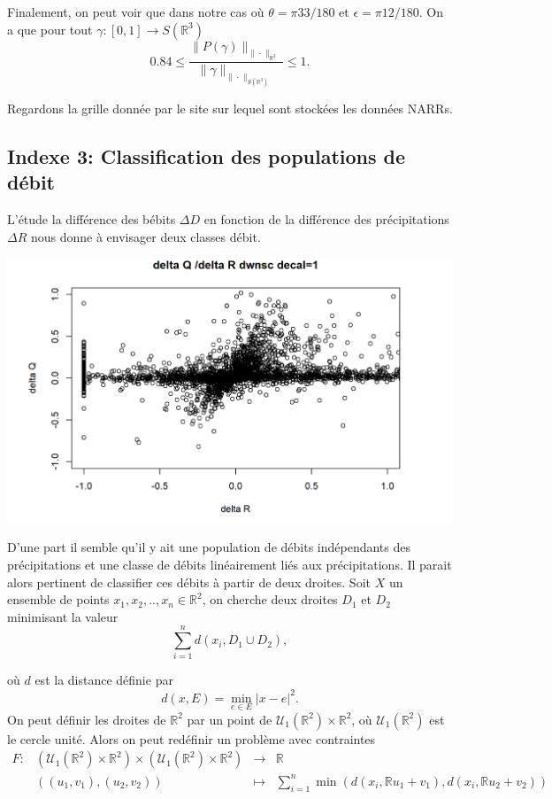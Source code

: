 \documentclass[a4paper,10pt]{article}
\begin{document}
Finalement, on peut voir que dans notre cas où $\theta=\pi 33/180$ et $\epsilon=\pi 12/180$. On a que pour tout $\gamma:[0,1]\to S(\mathbb{R}^3)$
\[0.84\leq \frac{\|P(\gamma)\|_{\|\cdot\|_{\mathbb{R}^2}}}{\|\gamma\|_{\|\cdot\|_{S(\mathbb{R}^3)}}} \leq 1.\]


Regardons la grille donnée par le site sur lequel sont stockées les données NARRs.

\subsection{Indexe 3: Classification des populations de débit}

L'étude la différence des bébits $\Delta D$ en fonction de la différence des précipitations $\Delta R$ nous donne à envisager deux classes débit.

\begin{center}
	\includegraphics[scale=0.3]{images/deb_prec_dec1.png}
\end{center}

D'une part il semble qu'il y ait une population de débits indépendants des précipitations et une classe de débits linéairement liés aux précipitations. Il parait alors pertinent de classifier ces débits à partir de deux droites.
Soit $X$ un ensemble de points  $x_1, x_2, .., x_n \in \mathbb{R}^2$, on cherche deux droites $D_1$ et $D_2$ minimisant la valeur
\[\sum_{i=1}^{n}d(x_i, D_1 \cup D_2),\]

où $d$ est la distance définie par 
\[d(x,E)= \min_{e \in E} |x-e|^2.\]
On peut définir les droites de $\mathbb{R}^2$ par un point de $\mathcal{U}_1(\mathbb{R}^2)\times\mathbb{R}^2$, où $\mathcal{U}_1(\mathbb{R}^2)$ est le cercle unité. Alors on peut redéfinir un problème avec contraintes 
\begin{equation}
	\label{F}
	\begin{array}{cccc}
		F: & (\mathcal{U}_1(\mathbb{R}^2)\times\mathbb{R}^2) \times (\mathcal{U}_1(\mathbb{R}^2)\times\mathbb{R}^2) &\to &\mathbb{R}\\
		& ((u_1,v_1), (u_2,v_2)) & \mapsto & \sum_{i=1}^{n}\min (d(x_i,\mathbb{R}u_1+v_1), d(x_i,\mathbb{R}u_2+v_2))
	\end{array}
\end{equation}
\end{document}
